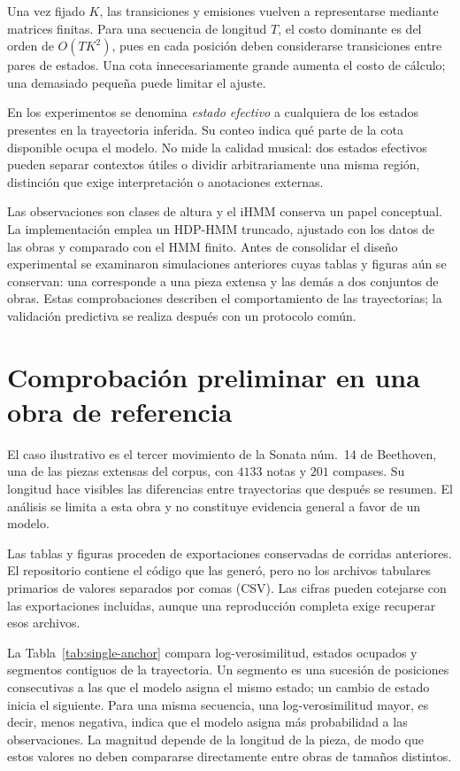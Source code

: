 Una vez fijado $K$, las transiciones y emisiones vuelven a representarse mediante matrices finitas. Para una secuencia de longitud $T$, el costo dominante es del orden de $O(TK^2)$, pues en cada posición deben considerarse transiciones entre pares de estados. Una cota innecesariamente grande aumenta el costo de cálculo; una demasiado pequeña puede limitar el ajuste.

En los experimentos se denomina \emph{estado efectivo} a cualquiera de los estados presentes en la trayectoria inferida. Su conteo indica qué parte de la cota disponible ocupa el modelo. No mide la calidad musical: dos estados efectivos pueden separar contextos útiles o dividir arbitrariamente una misma región, distinción que exige interpretación o anotaciones externas.

Las observaciones son clases de altura y el iHMM conserva un papel conceptual. La implementación emplea un HDP-HMM truncado, ajustado con los datos de las obras y comparado con el HMM finito. Antes de consolidar el diseño experimental se examinaron simulaciones anteriores cuyas tablas y figuras aún se conservan: una corresponde a una pieza extensa y las demás a dos conjuntos de obras. Estas comprobaciones describen el comportamiento de las trayectorias; la validación predictiva se realiza después con un protocolo común.

\section{Comprobación preliminar en una obra de referencia}

El caso ilustrativo es el tercer movimiento de la Sonata núm.~14 de Beethoven, una de las piezas extensas del corpus, con $4133$ notas y $201$ compases. Su longitud hace visibles las diferencias entre trayectorias que después se resumen. El análisis se limita a esta obra y no constituye evidencia general a favor de un modelo.

Las tablas y figuras proceden de exportaciones conservadas de corridas anteriores. El repositorio contiene el código que las generó, pero no los archivos tabulares primarios de valores separados por comas (CSV). Las cifras pueden cotejarse con las exportaciones incluidas, aunque una reproducción completa exige recuperar esos archivos.

La Tabla~\ref{tab:single-anchor} compara log-verosimilitud, estados ocupados y segmentos contiguos de la trayectoria. Un segmento es una sucesión de posiciones consecutivas a las que el modelo asigna el mismo estado; un cambio de estado inicia el siguiente. Para una misma secuencia, una log-verosimilitud mayor, es decir, menos negativa, indica que el modelo asigna más probabilidad a las observaciones. La magnitud depende de la longitud de la pieza, de modo que estos valores no deben compararse directamente entre obras de tamaños distintos.

